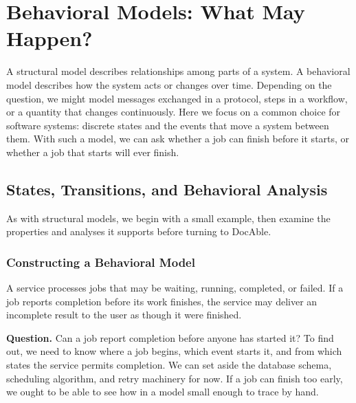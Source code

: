 


\chapter{Behavioral Models: What May Happen?}

A structural model describes relationships among parts of a system. A behavioral model describes how the system acts or changes over time. Depending on the question, we might model messages exchanged in a protocol, steps in a workflow, or a quantity that changes continuously. Here we focus on a common choice for software systems: discrete states and the events that move a system between them. With such a model, we can ask whether a job can finish before it starts, or whether a job that starts will ever finish.

\section{States, Transitions, and Behavioral Analysis}\label{heading:states-transitions-and-behavioral-analysis}

As with structural models, we begin with a small example, then examine the properties and analyses it supports before turning to DocAble.

\subsection{Constructing a Behavioral Model}\label{heading:constructing-a-behavioral-model}

A service processes jobs that may be waiting, running, completed, or failed. If a job reports completion before its work finishes, the service may deliver an incomplete result to the user as though it were finished.

\textbf{Question.} Can a job report completion before anyone has started it? To find out, we need to know where a job begins, which event starts it, and from which states the service permits completion. We can set aside the database schema, scheduling algorithm, and retry machinery for now. If a job can finish too early, we ought to be able to see how in a model small enough to trace by hand.


